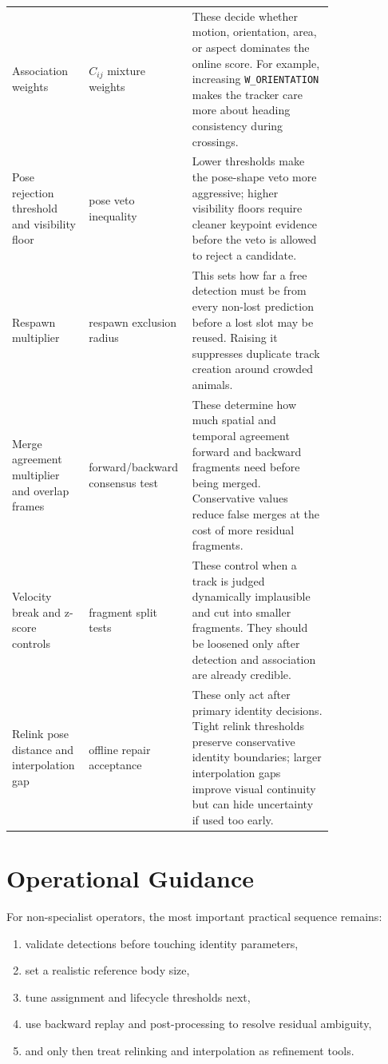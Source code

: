 \documentclass[11pt]{article}
\newcommand{\runtimekey}[1]{\texttt{#1}}
\begin{document}
\begin{longtable}{L{0.19\linewidth} L{0.19\linewidth} L{0.42\linewidth}}
Association weights & $C_{ij}$ mixture weights & These decide whether motion, orientation, area, or aspect dominates the online score. For example, increasing \runtimekey{W\_ORIENTATION} makes the tracker care more about heading consistency during crossings. \\
Pose rejection threshold and visibility floor & pose veto inequality & Lower thresholds make the pose-shape veto more aggressive; higher visibility floors require cleaner keypoint evidence before the veto is allowed to reject a candidate. \\
Respawn multiplier & respawn exclusion radius & This sets how far a free detection must be from every non-lost prediction before a lost slot may be reused. Raising it suppresses duplicate track creation around crowded animals. \\
Merge agreement multiplier and overlap frames & forward/backward consensus test & These determine how much spatial and temporal agreement forward and backward fragments need before being merged. Conservative values reduce false merges at the cost of more residual fragments. \\
Velocity break and z-score controls & fragment split tests & These control when a track is judged dynamically implausible and cut into smaller fragments. They should be loosened only after detection and association are already credible. \\
Relink pose distance and interpolation gap & offline repair acceptance & These only act after primary identity decisions. Tight relink thresholds preserve conservative identity boundaries; larger interpolation gaps improve visual continuity but can hide uncertainty if used too early. \\
\bottomrule
\end{longtable}
\normalsize
\endgroup

\section{Operational Guidance}

For non-specialist operators, the most important practical sequence remains:

\begin{enumerate}
  \item validate detections before touching identity parameters,
  \item set a realistic reference body size,
  \item tune assignment and lifecycle thresholds next,
  \item use backward replay and post-processing to resolve residual ambiguity,
  \item and only then treat relinking and interpolation as refinement tools.
\end{enumerate}
\end{document}
